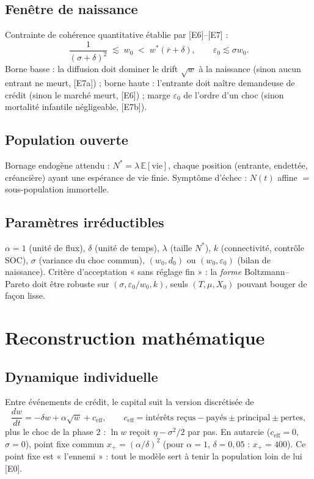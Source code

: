 \documentclass[11pt,a4paper]{article}
\newcommand{\E}{\mathbb{E}}
\begin{document}
\subsection{Fenêtre de naissance}
Contrainte de cohérence quantitative établie par [E6]--[E7] :
\begin{equation}
\label{eq:fenetre}
\frac{1}{(\sigma+\delta)^2} \;\lesssim\; w_0 \;<\; w^*(\bar r + \delta),
\qquad \varepsilon_0 \lesssim \sigma w_0 .
\end{equation}
Borne basse : la diffusion doit dominer le drift $\sqrt{w}$ à la naissance
(sinon aucun entrant ne meurt, [E7a]) ; borne haute : l'entrante doit naître
demandeuse de crédit (sinon le marché meurt, [E6]) ; marge $\varepsilon_0$ de
l'ordre d'un choc (sinon mortalité infantile négligeable, [E7b]).

\subsection{Population ouverte}
Bornage endogène attendu : $N^* = \lambda\,\E[\text{vie}]$, chaque position
(entrante, endettée, créancière) ayant une espérance de vie finie. Symptôme
d'échec : $N(t)$ affine $=$ sous-population immortelle.

\subsection{Paramètres irréductibles}
$\alpha = 1$ (unité de flux), $\delta$ (unité de temps), $\lambda$ (taille
$N^*$), $k$ (connectivité, contrôle SOC), $\sigma$ (variance du choc commun),
$(w_0, d_0)$ ou $(w_0, \varepsilon_0)$ (bilan de naissance). Critère
d'acceptation « sans réglage fin » : la \emph{forme} Boltzmann--Pareto doit
être robuste sur $(\sigma, \varepsilon_0/w_0, k)$, seuls $(T, \mu, X_0)$
pouvant bouger de façon lisse.

\section{Reconstruction mathématique}
\label{sec:math}

\subsection{Dynamique individuelle}
Entre événements de crédit, le capital suit la version discrétisée de
\begin{equation}
\frac{dw}{dt} = -\delta w + \alpha\sqrt{w} + c_{\mathrm{eff}},
\qquad c_{\mathrm{eff}} = \text{intérêts reçus} - \text{payés}
\pm \text{principal} \pm \text{pertes},
\end{equation}
plus le choc de la phase 2 : $\ln w$ reçoit $\eta - \sigma^2/2$ par pas.
En autarcie ($c_{\mathrm{eff}} = 0$, $\sigma = 0$), point fixe commun
$x_+ = (\alpha/\delta)^2$ (pour $\alpha=1$, $\delta = 0{,}05$ : $x_+ = 400$).
Ce point fixe est « l'ennemi » : tout le modèle sert à tenir la population
loin de lui [E0].
\end{document}
